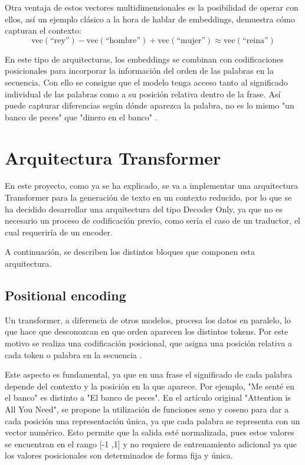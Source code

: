 \documentclass[11pt]{book}
\begin{document}
Otra ventaja de estos vectores multidimensionales es la posibilidad de operar con ellos, así un ejemplo clásico a la hora de hablar de embeddings, demuestra cómo capturan el contexto: 
\[
\text{vec}(\text{``rey''}) - \text{vec}(\text{``hombre''}) + \text{vec}(\text{``mujer''}) \approx \text{vec}(\text{``reina''})
\]

En este tipo de arquitecturas, los embeddings se combinan con codificaciones posicionales para incorporar la información del orden de las palabras en la secuencia. Con ello se consigue que el modelo tenga acceso tanto al significado individual de las palabras como a su posición relativa dentro de la frase. Así puede capturar diferencias según dónde aparezca la palabra, no es lo mismo "un banco de peces" que "dinero en el banco" \parencite{perez_embeddings}.

\section{Arquitectura Transformer} \label{Arquitectura Transformer}

En este proyecto, como ya se ha explicado, se va a implementar una arquitectura Transformer para la generación de texto en un contexto reducido, por lo que se ha decidido desarrollar una arquitectura del tipo Decoder Only, ya que no es necesario un proceso de codificación previo, como sería el caso de un traductor, el cual requeriría de un encoder.

A continuación, se describen los distintos bloques que componen esta arquitectura.

\subsection{Positional encoding}
Un transformer, a diferencia de otros modelos, procesa los datos en paralelo, lo que hace que desconozcan en que orden aparecen los distintos tokens. Por este motivo se realiza una codificación posicional, que asigna una posición relativa a cada token o palabra en la secuencia \parencite{phillips2019positional}. 

Este aspecto es fundamental, ya que en una frase el significado de cada palabra depende del contexto y la posición en la que aparece. Por ejemplo, "Me senté en el banco" es distinto a "El banco de peces". En el artículo original "Attention is All You Need", se propone la utilización de funciones seno y coseno para dar a cada posición una representación única, ya que cada palabra se representa con un vector numérico. Esto permite que la salida esté normalizada, pues estos valores se encuentran en el rango [-1 ,1] y no requiere de entrenamiento adicional ya que los valores posicionales son determinados de forma fija y única. 
\end{document}
